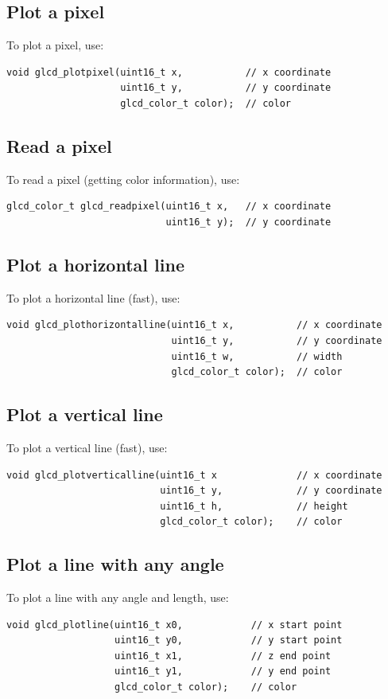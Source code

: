 \documentclass[12pt]{article}
\begin{document}
\subsection{Plot a pixel}
To plot a pixel, use:
\begin{lstlisting}
void glcd_plotpixel(uint16_t x,           // x coordinate
                    uint16_t y,           // y coordinate
                    glcd_color_t color);  // color
\end{lstlisting}

\subsection{Read a pixel}
To read a pixel (getting color information), use:

\begin{lstlisting}
glcd_color_t glcd_readpixel(uint16_t x,   // x coordinate
                            uint16_t y);  // y coordinate
\end{lstlisting}

\subsection{Plot a horizontal line}
To plot a horizontal line (fast), use:
\begin{lstlisting}
void glcd_plothorizontalline(uint16_t x,           // x coordinate
                             uint16_t y,           // y coordinate
                             uint16_t w,           // width
                             glcd_color_t color);  // color
\end{lstlisting}


\subsection{Plot a vertical line}
To plot a vertical line (fast), use:
\begin{lstlisting}
void glcd_plotverticalline(uint16_t x              // x coordinate
                           uint16_t y,             // y coordinate
                           uint16_t h,             // height
                           glcd_color_t color);    // color
\end{lstlisting}

\subsection{Plot a line with any angle}
To plot a line with any angle and length, use:
\begin{lstlisting}
void glcd_plotline(uint16_t x0,            // x start point
                   uint16_t y0,            // y start point
                   uint16_t x1,            // z end point
                   uint16_t y1,            // y end point
                   glcd_color_t color);    // color
\end{lstlisting}
\end{document}
